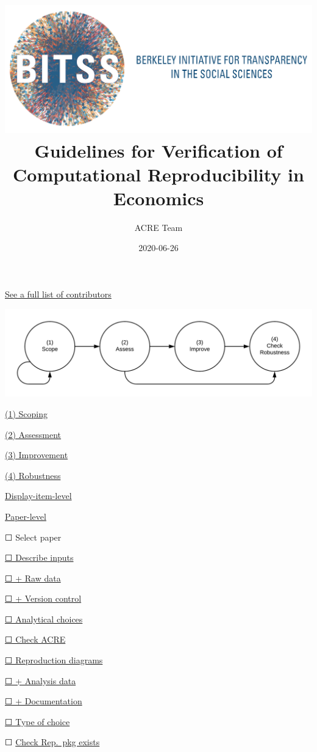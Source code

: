 \documentclass[]{book}
\title{\href{https://www.bitss.org/}{\includegraphics{BITSS_logo_horizontal.png}}\\
Guidelines for Verification of Computational Reproducibility in Economics}
\author{ACRE Team}
\date{2020-06-26}
\begin{document}
\maketitle

{
\setcounter{tocdepth}{1}
\tableofcontents
}
\hypertarget{section}{%
\chapter*{}\label{section}}

\protect\hyperlink{contributions}{See a full list of contributors}

\includegraphics[width=1\linewidth]{stages}

\protect\hyperlink{scoping}{(1) Scoping}

\protect\hyperlink{assessment}{(2) Assessment}

\protect\hyperlink{improvements}{(3) Improvement}

\protect\hyperlink{robust}{(4) Robustness}

\protect\hyperlink{improvements}{Display-item-level}

\protect\hyperlink{paper-level}{Paper-level}

☐ Select paper

\protect\hyperlink{describe-inputs}{☐ Describe inputs}

\protect\hyperlink{rd}{☐ + Raw data}

\protect\hyperlink{paper-level}{☐ + Version control}

\protect\hyperlink{id-analy}{☐ Analytical choices}

\protect\hyperlink{check-acre}{☐ Check ACRE}

\protect\hyperlink{diagram}{☐ Reproduction diagrams}

\protect\hyperlink{ad}{☐ + Analysis data}

\protect\hyperlink{paper-level}{☐ + Documentation}

\protect\hyperlink{id-type}{☐ Type of choice}

☐ \protect\hyperlink{verify-rep-mat}{Check Rep.~pkg exists}
\end{document}
